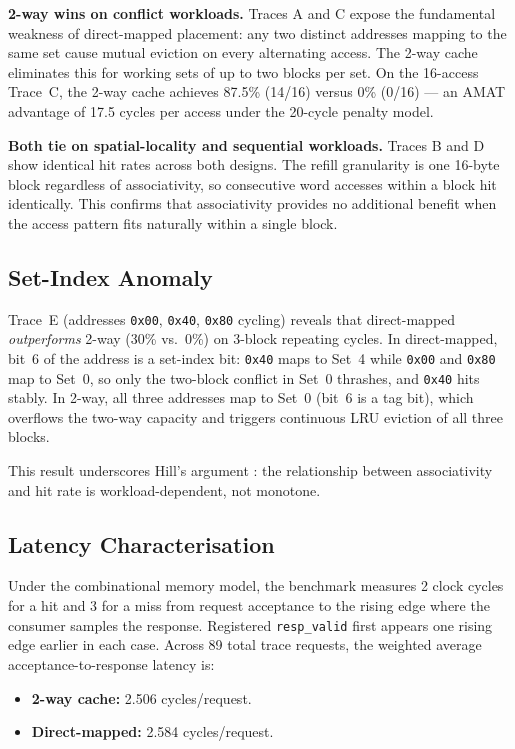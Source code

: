 \documentclass[conference]{IEEEtran}
\begin{document}
\textbf{2-way wins on conflict workloads.}
Traces A and C expose the fundamental weakness of direct-mapped placement:
any two distinct addresses mapping to the same set cause mutual eviction on
every alternating access.
The 2-way cache eliminates this for working sets of up to two blocks per
set.
On the 16-access Trace~C, the 2-way cache achieves 87.5\% (14/16) versus
0\% (0/16) — an AMAT advantage of 17.5 cycles per access under the 20-cycle
penalty model.

\textbf{Both tie on spatial-locality and sequential workloads.}
Traces B and D show identical hit rates across both designs.
The refill granularity is one 16-byte block regardless of associativity,
so consecutive word accesses within a block hit identically.
This confirms that associativity provides no additional benefit when the
access pattern fits naturally within a single block.

\subsection{Set-Index Anomaly}
\label{subsec:anomaly}

Trace~E (addresses {\tt 0x00}, {\tt 0x40}, {\tt 0x80} cycling) reveals
that direct-mapped \emph{outperforms} 2-way (30\% vs.\ 0\%) on 3-block
repeating cycles.
In direct-mapped, bit~6 of the address is a set-index bit:
{\tt 0x40} maps to Set~4 while {\tt 0x00} and {\tt 0x80} map to Set~0,
so only the two-block conflict in Set~0 thrashes, and {\tt 0x40} hits
stably.
In 2-way, all three addresses map to Set~0 (bit~6 is a tag bit), which
overflows the two-way capacity and triggers continuous LRU eviction of
all three blocks.

This result underscores Hill's argument \cite{hill1988}: the relationship
between associativity and hit rate is workload-dependent, not monotone.

\subsection{Latency Characterisation}
\label{subsec:latency}

Under the combinational memory model, the benchmark measures 2 clock
cycles for a hit and 3 for a miss from request acceptance to the rising
edge where the consumer samples the response. Registered
\texttt{resp\_valid} first appears one rising edge earlier in each case.
Across 89 total trace requests, the weighted average acceptance-to-response
latency is:
\begin{itemize}
  \item \textbf{2-way cache:} 2.506 cycles/request.
  \item \textbf{Direct-mapped:} 2.584 cycles/request.
\end{itemize}
\end{document}

